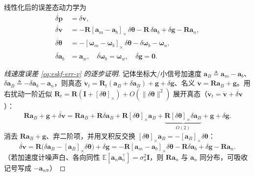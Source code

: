\begin{theorem}\label{thm:eskf-error-kin}
线性化后的误差态动力学为\cite{sola2017quaternion}
\begin{align}
  \dot{\delta\mathbf{p}}&=\delta\mathbf{v},\label{eq:eskf-err-p}\\
  \dot{\delta\mathbf{v}}&=-\mathbf{R}[\mathbf{a}_m-\mathbf{a}_b]_\times\,\delta\boldsymbol{\theta}-\mathbf{R}\,\delta\mathbf{a}_b+\delta\mathbf{g}-\mathbf{R}\mathbf{a}_n,\label{eq:eskf-err-v}\\
  \dot{\delta\boldsymbol{\theta}}&=-[\boldsymbol{\omega}_m-\boldsymbol{\omega}_b]_\times\,\delta\boldsymbol{\theta}-\delta\boldsymbol{\omega}_b-\boldsymbol{\omega}_n,\label{eq:eskf-err-theta}\\
  \dot{\delta\mathbf{a}}_b&=\mathbf{a}_w,\quad \dot{\delta\boldsymbol{\omega}}_b=\boldsymbol{\omega}_w,\quad \dot{\delta\mathbf{g}}=\mathbf{0}.\label{eq:eskf-err-bias}
\end{align}
\end{theorem}
\begin{proof}[线速度误差 \cref{eq:eskf-err-v} 的逐步证明]
记体坐标大/小信号加速度 $\mathbf{a}_B\triangleq\mathbf{a}_m-\mathbf{a}_b$、$\delta\mathbf{a}_B\triangleq-\delta\mathbf{a}_b-\mathbf{a}_n$，则真态 $\dot{\mathbf{v}}_t=\mathbf{R}_t(\mathbf{a}_B+\delta\mathbf{a}_B)+\mathbf{g}+\delta\mathbf{g}$、名义 $\dot{\mathbf{v}}=\mathbf{R}\mathbf{a}_B+\mathbf{g}$。用右扰动一阶近似 $\mathbf{R}_t=\mathbf{R}(\mathbf{I}+[\delta\boldsymbol{\theta}]_\times)+O(\|\delta\boldsymbol{\theta}\|^2)$ 展开真态（$\dot{\mathbf{v}}_t=\dot{\mathbf{v}}+\dot{\delta\mathbf{v}}$）：
\[
  \mathbf{R}\mathbf{a}_B+\mathbf{g}+\dot{\delta\mathbf{v}}=\mathbf{R}\mathbf{a}_B+\mathbf{R}\delta\mathbf{a}_B+\mathbf{R}[\delta\boldsymbol{\theta}]_\times\mathbf{a}_B+\underbrace{\mathbf{R}[\delta\boldsymbol{\theta}]_\times\delta\mathbf{a}_B}_{O(2)}+\mathbf{g}+\delta\mathbf{g}.
\]
消去 $\mathbf{R}\mathbf{a}_B+\mathbf{g}$、弃二阶项，并用叉积反交换 $[\delta\boldsymbol{\theta}]_\times\mathbf{a}_B=-[\mathbf{a}_B]_\times\delta\boldsymbol{\theta}$：
\[
  \dot{\delta\mathbf{v}}=\mathbf{R}\big(\delta\mathbf{a}_B-[\mathbf{a}_B]_\times\delta\boldsymbol{\theta}\big)+\delta\mathbf{g}
  =-\mathbf{R}[\mathbf{a}_m-\mathbf{a}_b]_\times\delta\boldsymbol{\theta}-\mathbf{R}\delta\mathbf{a}_b+\delta\mathbf{g}-\mathbf{R}\mathbf{a}_n.
\]
（若加速度计噪声白、各向同性 $\mathbb{E}[\mathbf{a}_n\mathbf{a}_n^\top]=\sigma_a^2\mathbf{I}$，则 $\mathbf{R}\mathbf{a}_n$ 与 $\mathbf{a}_n$ 同分布，可吸收记号写成 $-\mathbf{a}_n$。）
\end{proof}
